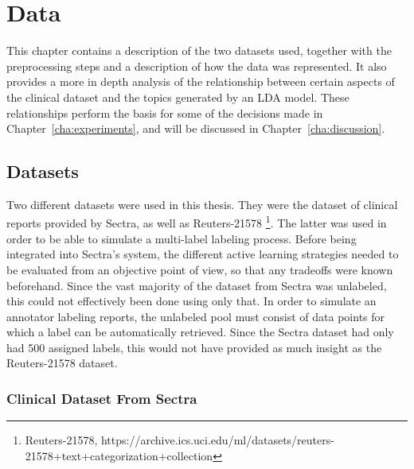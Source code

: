 \chapter{Data}
\label{cha:data}

This chapter contains a description of the two datasets used, together with the preprocessing steps and a description of how the data was represented.
It also provides a more in depth analysis of the relationship between certain aspects of the clinical dataset and the topics generated by an LDA model.
These relationships perform the basis for some of the decisions made in Chapter~\ref{cha:experiments}, and will be discussed in Chapter~\ref{cha:discussion}.

\section{Datasets}\label{sec:datasets}

Two different datasets were used in this thesis.
They were the dataset of clinical reports provided by Sectra, as well as Reuters-21578 \footnote{Reuters-21578, https://archive.ics.uci.edu/ml/datasets/reuters-21578+text+categorization+collection}.
The latter was used in order to be able to simulate a multi-label labeling process.
Before being integrated into Sectra's system, the different active learning strategies needed to be evaluated from an objective point of view, so that any tradeoffs were known beforehand.
Since the vast majority of the dataset from Sectra was unlabeled, this could not effectively been done using only that.
In order to simulate an annotator labeling reports, the unlabeled pool must consist of data points for which a label can be automatically retrieved.
Since the Sectra dataset had only had 500 assigned labels, this would not have provided as much insight as the Reuters-21578 dataset.

\subsection{Clinical Dataset From Sectra}

